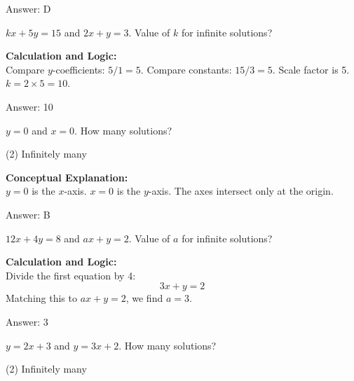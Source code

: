 \documentclass[11pt,paper=a4,answers]{exam}
\begin{document}
\begin{questions}
\begin{solution}
\vspace{15pt}
Answer: \colorbox{yellow!100}{D}
\end{solution}

\question
$kx + 5y = 15$ and $2x + y = 3$. Value of $k$ for infinite solutions?

\begin{solution}
\textbf{Calculation and Logic:} \\
Compare $y$-coefficients: $5/1 = 5$.
Compare constants: $15/3 = 5$.
Scale factor is 5.
$k = 2 \times 5 = 10$.

\vspace{15pt}
Answer: \colorbox{yellow!100}{10}
\end{solution}

\question
$y = 0$ and $x = 0$. How many solutions?
\begin{tasks}(2)
    \task Infinitely many
\end{tasks}

\begin{solution}
\textbf{Conceptual Explanation:} \\
$y = 0$ is the $x$-axis. $x = 0$ is the $y$-axis. The axes intersect only at the origin.

\vspace{15pt}
Answer: \colorbox{yellow!100}{B}
\end{solution}

\question
$12x + 4y = 8$ and $ax + y = 2$. Value of $a$ for infinite solutions?

\begin{solution}
\textbf{Calculation and Logic:} \\
Divide the first equation by 4:
\[ 3x + y = 2 \]
Matching this to $ax + y = 2$, we find $a = 3$.

\vspace{15pt}
Answer: \colorbox{yellow!100}{3}
\end{solution}

\question
$y = 2x + 3$ and $y = 3x + 2$. How many solutions?
\begin{tasks}(2)
    \task Infinitely many
\end{tasks}


\end{questions}
\end{document}
